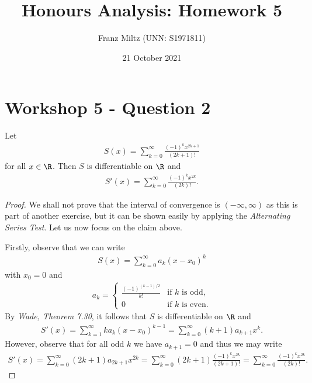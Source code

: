 \documentclass{article}
\begin{document}
\title{Honours Analysis: Homework 5}
\author{Franz Miltz (UNN: S1971811)}
\date{21 October 2021}
\maketitle

\section*{Workshop 5 - Question 2}

\begin{claim*}
   Let 
   \begin{align*}
      S(x)=\sum_{k=0}^\infty \frac{(-1)^k x^{2k+1}}{(2k+1)!}
   \end{align*}
   for all $x\in\R$. Then $S$ is differentiable on $\R$ and 
   \begin{align*}
      S'(x) = \sum_{k=0}^\infty \frac{(-1)^kx^{2k}}{(2k)!}.
   \end{align*}
\end{claim*}

\begin{proof}
   We shall not prove that the interval of convergence is $(-\infty,\infty)$
   as this is part of another exercise, but it can be shown easily by 
   applying the \emph{Alternating Series Test}. Let us now focus on the claim above.
   
   Firstly, observe that we can write 
   \begin{align*}
      S(x) = \sum_{k=0}^\infty a_k(x-x_0)^k
   \end{align*}
   with $x_0 = 0$ and 
   \begin{align*}
      a_k = \begin{cases}
         \frac{(-1)^{(k-1)/2}}{k!} &\text{if $k$ is odd},\\
         0 &\text{if $k$ is even}.
      \end{cases}
   \end{align*}
   By \emph{Wade, Theorem 7.30}, it follows that $S$ is differentiable on $\R$
   and 
   \begin{align*}
      S'(x) = \sum_{k=1}^\infty ka_k(x-x_0)^{k-1}
      = \sum_{k=0}^\infty (k+1)a_{k+1}x^k.
   \end{align*}
   However, observe that for all odd $k$ we have $a_{k+1}=0$
   and thus we may write 
   \begin{align*}
      S'(x) = \sum_{k=0}^\infty (2k+1)a_{2k+1}x^{2k}
      = \sum_{k=0}^\infty (2k+1)\frac{(-1)^k x^{2k}}{(2k+1)!}
      = \sum_{k=0}^\infty \frac{(-1)^k x^{2k}}{(2k)!}.
   \end{align*}
\end{proof}
\end{document}
